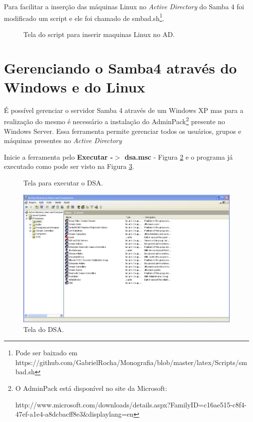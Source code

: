 Para facilitar a inserção das máquinas Linux no \textit{Active Directory} do Samba 4 foi modificado um script e ele foi chamado de smbad.sh\footnote[4]{Pode ser baixado em https://github.com/GabrielRocha/Monografia/blob/master/latex/Scripts/smbad.sh}. 

\begin{figure}[ht]
   	\centering
   	\caption{Tela do script para inserir maquinas Linux no AD.}
    \label{smbad}
\end{figure}

\section{Gerenciando o Samba4 através do Windows e do Linux}

É possível gerenciar o servidor Samba 4 através de um Windows XP mas para a realização do mesmo é necessário a instalação do AdminPack\footnote[4]{O AdminPack está disponível no site da Microsoft:

http://www.microsoft.com/downloads/details.aspx?FamilyID=c16ae515-c8f4-47ef-a1e4-a8dcbacff8e3\&displaylang=en} presente no Windows Server. Essa ferramenta permite gerenciar todos os usuários, grupos e máquinas presentes no \textit{Active Directory}

Inicie a ferramenta pelo \textbf{Executar -$>$ dsa.msc} - Figura \ref{dsa} e o programa já executado como pode ser visto na Figura \ref{tela_dsa}.

\begin{figure}[ht]
   	\centering
   	\caption{Tela para executar o DSA.}
    \label{dsa}
\end{figure}
 
\begin{figure}[h!]
   	\centering
    \includegraphics[width=0.7 \textwidth]{figuras/addsa}
   	\caption{Tela do DSA.}
    \label{tela_dsa}
\end{figure}

